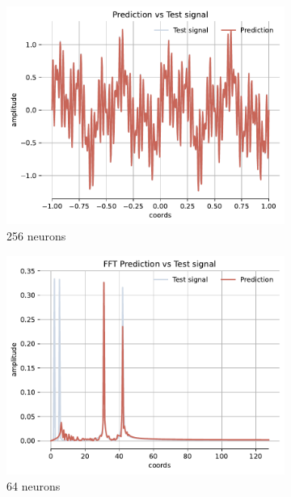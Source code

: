 \begin{figure}[h!]
    \begin{subfigure}[b]{0.32\textwidth}
        \centering
        \includegraphics[width=\textwidth]{img/ch3/prediction_w45all_hf256.pdf}
        \caption{256 neurons}
        \label{fig:rec-256-full-45}
    \end{subfigure}
    \begin{subfigure}[b]{0.32\textwidth}
        \centering
        \includegraphics[width=\textwidth]{img/ch3/fft_w45all_hf64.pdf}
        \caption{64 neurons}
        \label{fig:fft-64-full-45}
    \end{subfigure}
    \hfill
    \begin{subfigure}[b]{0.32\textwidth}

\end{subfigure}
\end{figure}
